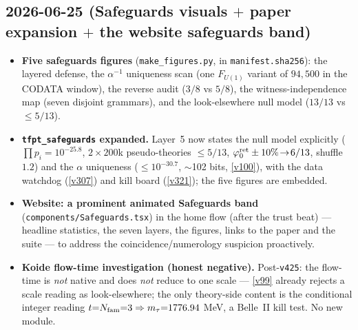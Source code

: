 \subsection*{2026-06-25 (Safeguards visuals $+$ paper expansion $+$ the website safeguards band)}
\begin{itemize}
\item \textbf{Five safeguards figures} (\texttt{make\_figures.py}, in \texttt{manifest.sha256}): the
layered defense, the $\alpha^{-1}$ uniqueness scan (one $F_{U(1)}$ variant of $94{,}500$ in the CODATA
window), the reverse audit ($3/8$ vs $5/8$), the witness-independence map (seven disjoint grammars), and the
look-elsewhere null model ($13/13$ vs $\le5/13$).
\item \textbf{\texttt{tfpt\_safeguards} expanded.} Layer~5 now states the null model explicitly
($\prod p_i{=}10^{-25.8}$, $2{\times}200$k pseudo-theories $\le5/13$, $\varphi_0^{\mathrm{ret}}\pm10\%\!\to\!6/13$, shuffle
$1.2$) and the $\alpha$ uniqueness ($\le10^{-30.7}$, $\sim$102 bits, \vref{v100}), with the data watchdog
(\vref{v307}) and kill board (\vref{v321}); the five figures are embedded.
\item \textbf{Website: a prominent animated Safeguards band} (\texttt{components/Safeguards.tsx}) in the
home flow (after the trust beat) --- headline statistics, the seven layers, the figures, links to the paper
and the suite --- to address the coincidence/numerology suspicion proactively.
\item \textbf{Koide flow-time investigation (honest negative).} Post-\texttt{v425}: the flow-time is
\emph{not} native and does \emph{not} reduce to one scale --- \vref{v99} already rejects a scale reading as
look-elsewhere; the only theory-side content is the conditional integer reading $t{=}N_{\mathrm{fam}}{=}3\Rightarrow
m_\tau{=}1776.94$ MeV, a Belle~II kill test. No new module.
\end{itemize}

